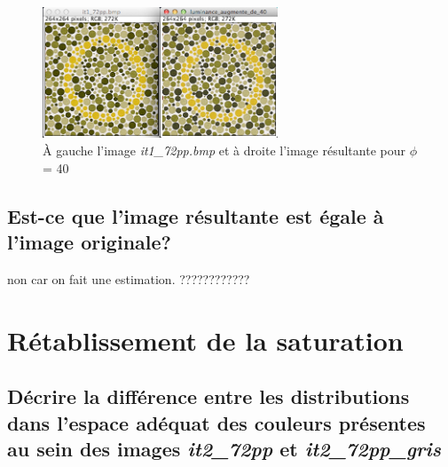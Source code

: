 \documentclass[a4paper,10pt]{article}
\begin{document}
\begin{figure}[ht]
\begin{center}
	\includegraphics[width=7cm]{images/it_72pp_changement_luminosite.png}
\end{center}
	\caption{\`A gauche l'image \emph{it1\_72pp.bmp} et \`a droite l'image r\'esultante pour $\phi$ = 40}
	\label{it_72pp_changement_luminosite}
\end{figure}

\subsection{Est-ce que l'image r\'esultante est \'egale \`a l'image originale?}

non car on fait une estimation.
????????????

\section{R\'etablissement de la saturation}

\subsection{D\'ecrire la diff\'erence entre les distributions dans l'espace ad\'equat des couleurs pr\'esentes au sein des images \emph{it2\_72pp} et \emph{it2\_72pp\_gris}}
\end{document}
